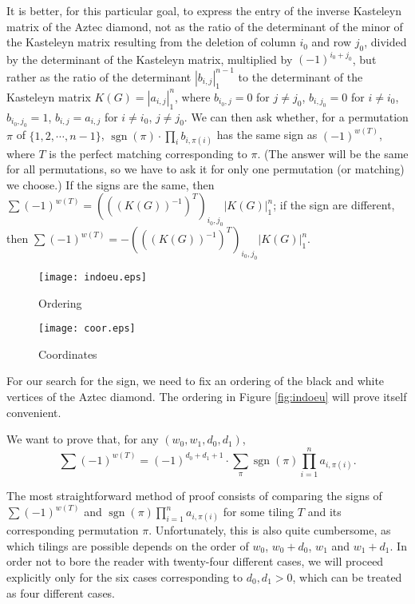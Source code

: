 \documentclass[10pt,reqno]{amsart}
\theoremstyle{plain}
\theoremstyle{definition}
\theoremstyle{remark}
\def\determinant#1{\left|#1\right|}
\DeclareMathOperator{\sgn }{sgn }
\begin{document}
It is better, for this particular goal, to
express the entry of the inverse Kasteleyn matrix of the Aztec diamond, 
not as the ratio of the determinant of the minor of the Kasteleyn matrix
resulting from the deletion of 
column $i_0$ and row $j_0$, divided by the determinant of the Kasteleyn
matrix, multiplied by $(-1)^{i_0+j_0}$, but rather as the ratio
of the determinant $\determinant{b_{i,j}}_1^{n-1}$ to the determinant of the
Kasteleyn matrix $K(G) = \determinant{a_{i,j}}_1^n$, where $b_{i_0,j}=0$
for $j\ne j_0$, $b_{i,j_0}=0$ for $i\ne i_0$, $b_{i_0,j_0}=1$,
$b_{i,j}=a_{i,j}$ for $i\ne i_0$, $j\ne j_0$. We can then ask whether,
for a permutation $\pi $ of $\{1,2,\dotsb ,n-1\}$, 
$\sgn(\pi ) \cdot \prod_{i} b_{i,\pi(i)}$
has the same sign as $(-1)^{w(T)}$, where $T$ is the perfect matching 
corresponding to $\pi$. (The answer will be the same for all permutations, 
so we have to ask it for only one permutation (or matching) we choose.)
If the signs are the same, then
$\sum (-1)^{w(T)} = 
(((K(G))^{-1})^T)_{i_0,j_0} \determinant{K(G)}_1^n$; if
the sign are different, then
$\sum (-1)^{w(T)} = 
- (((K(G))^{-1})^T)_{i_0,j_0} \determinant{K(G)}_1^n$.

\begin{figure}
        \begin{minipage}[b]{0.5\linewidth}
                \centering \texttt{[image: indoeu.eps]}
                \caption{Ordering}\label{fig:indoeu}
        \end{minipage}
        \begin{minipage}[b]{0.5\linewidth}
                \texttt{[image: coor.eps]}
                \caption{Coordinates} \label{fig:coor}   
        \end{minipage}
\end{figure}

For our search for the sign, we need to fix an ordering of the black and
white vertices of the Aztec diamond. The ordering in Figure
\ref{fig:indoeu} will prove itself convenient.

We want to prove that, for any $(w_0,w_1,d_0,d_1)$, 
\[
\sum (-1)^{w(T)} = (-1)^{d_0+d_1+1}\cdot 
\sum_{\pi } \sgn(\pi ) \prod_{i=1}^n a_{i,\pi(i)}. \label{eq:mandrake}
\]

The most straightforward method of proof consists of comparing the signs
of $\sum (-1)^{w(T)}$ and $\sgn(\pi ) \prod_{i=1}^n a_{i,\pi(i)}$ for
some tiling $T$ and its corresponding permutation $\pi $. Unfortunately,
this is also quite cumbersome, as which tilings are possible depends
on the order of $w_0$, $w_0+d_0$, $w_1$ and $w_1+d_1$. In order not to
bore the reader with twenty-four different cases, we will proceed
explicitly only for the six cases corresponding to $d_0,d_1>0$, which
can be treated as four different cases.
\end{document}
